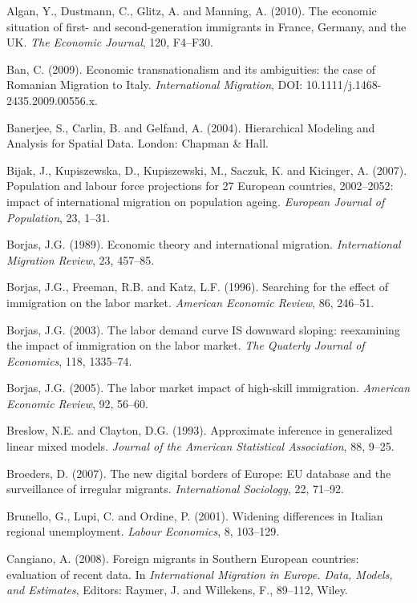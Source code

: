 \documentclass[12pt]{article}
\theoremstyle{definition}
\theoremstyle{plain}
\begin{document}
\begin{thebibliography}{99}

\bibitem{} Algan, Y., Dustmann, C., Glitz, A. and Manning, A. (2010). The economic situation of first- and second-generation immigrants in France, Germany, and the UK. \textit{The Economic Journal}, 120, F4--F30.

\bibitem{} Ban, C. (2009). Economic transnationalism and its ambiguities: the case of Romanian Migration to Italy. \textit{International Migration}, DOI: 10.1111/j.1468-2435.2009.00556.x.

\bibitem{} Banerjee, S., Carlin, B. and Gelfand, A. (2004). Hierarchical Modeling and Analysis for Spatial Data. London: Chapman \& Hall.

\bibitem{} Bijak, J., Kupiszewska, D., Kupiszewski, M., Saczuk, K. and Kicinger, A. (2007). Population and labour force projections for 27 European countries, 2002--2052: impact of international migration on population ageing. \textit{European Journal of Population}, 23, 1--31.

\bibitem{} Borjas, J.G. (1989). Economic theory and international migration. \textit{International Migration Review}, 23, 457--85.

\bibitem{} Borjas, J.G., Freeman, R.B. and Katz, L.F. (1996). Searching for the effect of immigration on the labor market. \textit{American Economic Review}, 86, 246--51.

\bibitem{} Borjas, J.G. (2003). The labor demand curve IS downward sloping: reexamining the impact of immigration on the labor market. \textit{The Quaterly Journal of Economics}, 118, 1335--74.

\bibitem{} Borjas, J.G. (2005). The labor market impact of high-skill immigration. \textit{American Economic Review}, 92, 56--60.

\bibitem{} Breslow, N.E. and Clayton, D.G. (1993). Approximate inference in generalized linear mixed models. \textit{Journal of the American Statistical Association}, 88, 9--25.

\bibitem{} Broeders, D. (2007). The new digital borders of Europe: EU database and the surveillance of irregular migrants. \textit{International Sociology}, 22, 71--92.

\bibitem{} Brunello, G., Lupi, C. and Ordine, P. (2001). Widening differences in Italian regional unemployment. \textit{Labour Economics}, 8, 103--129.

\bibitem{} Cangiano, A. (2008). Foreign migrants in Southern European countries: evaluation of recent data. In \textit{International Migration in Europe. Data, Models, and Estimates}, Editors: Raymer, J. and Willekens, F., 89--112, Wiley.


\end{thebibliography}
\end{document}

